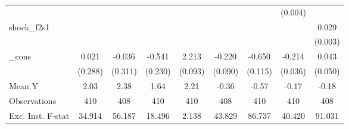 {\begin{tabular}{l*{8}{c}}
            &                     &                     &                     &                     &                     &                     &     (0.004)         &                     \\
\addlinespace
shock\_f2s1  &                     &                     &                     &                     &                     &                     &                     &       0.029\sym{***}\\
            &                     &                     &                     &                     &                     &                     &                     &     (0.003)         \\
\addlinespace
\_cons      &       0.021         &      -0.036         &      -0.541\sym{**} &       2.213\sym{***}&      -0.220\sym{**} &      -0.650\sym{***}&      -0.214\sym{***}&       0.043         \\
            &     (0.288)         &     (0.311)         &     (0.230)         &     (0.093)         &     (0.090)         &     (0.115)         &     (0.036)         &     (0.050)         \\
\midrule
Mean Y      &        2.03         &        2.38         &        1.64         &        2.21         &       -0.36         &       -0.57         &       -0.17         &       -0.18         \\
Observations&         410         &         408         &         410         &         410         &         408         &         410         &         410         &         408         \\
Exc. Inst. F-stat&      34.914         &      56.187         &      18.496         &       2.138         &      43.829         &      86.737         &      40.420         &      91.031         \\
\bottomrule
\end{tabular}
}
